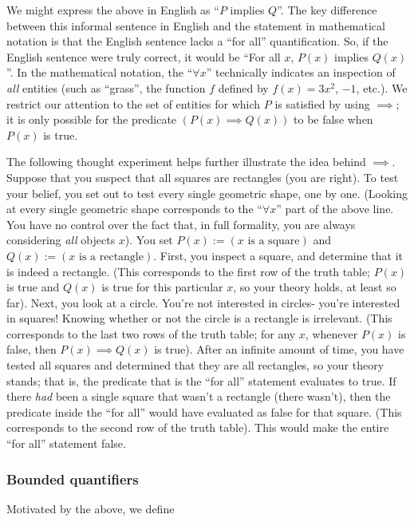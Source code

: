 We might express the above in English as ``$P$ implies $Q$''. The key difference between this informal sentence in English and the statement in mathematical notation is that the English sentence lacks a ``for all'' quantification. So, if the English sentence were truly correct, it would be ``For all $x$, $P(x)$ implies $Q(x)$''. In the mathematical notation, the ``$\forall x$'' technically indicates an inspection of \textit{all} entities (such as ``grass'', the function $f$ defined by $f(x) = 3x^2$, $-1$, etc.). We restrict our attention to the set of entities for which $P$ is satisfied by using $\implies$; it is only possible for the predicate $(P(x) \implies Q(x))$ to be false when $P(x)$ is true.

The following thought experiment helps further illustrate the idea behind $\implies$. Suppose that you suspect that all squares are rectangles (you are right). To test your belief, you set out to test every single geometric shape, one by one. (Looking at every single geometric shape corresponds to the ``$\forall x$'' part of the above line. You have no control over the fact that, in full formality, you are always considering \textit{all} objects $x$). You set $P(x) := (\text{$x$ is a square})$ and $Q(x) := (\text{$x$ is a rectangle})$. First, you inspect a square, and determine that it is indeed a rectangle. (This corresponds to the first row of the truth table; $P(x)$ is true and $Q(x)$ is true for this particular $x$, so your theory holds, at least so far). Next, you look at a circle. You're not interested in circles- you're interested in squares! Knowing whether or not the circle is a rectangle is irrelevant. (This corresponds to the last two rows of the truth table; for any $x$, whenever $P(x)$ is false, then $P(x) \implies Q(x)$ is true). After an infinite amount of time, you have tested all squares and determined that they are all rectangles, so your theory stands; that is, the predicate that is the ``for all'' statement evaluates to true. If there \textit{had} been a single square that wasn't a rectangle (there wasn't), then the predicate inside the ``for all'' would have evaluated as false for that square. (This corresponds to the second row of the truth table). This would make the entire ``for all'' statement false.

\subsubsection*{Bounded quantifiers}

Motivated by the above, we define

